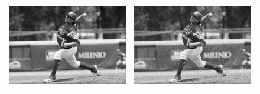 	\begin{landscape}
		\begin{figure}[!h]
			\begin{tabular}{cc}
				\includegraphics[width=12.25cm]{Imagenes/Ruido_gauss_bn_1.png} & \includegraphics[width=12.25cm]{Imagenes/Ruido_gauss_bn_2.png} \\

\end{tabular}
\end{figure}
\end{landscape}
